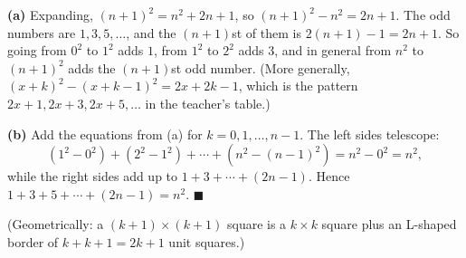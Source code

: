 \textbf{(a)} Expanding, $(n+1)^2=n^2+2n+1$, so $(n+1)^2-n^2=2n+1$. The odd numbers are $1,3,5,\dots$, and the $(n+1)$st of them is $2(n+1)-1=2n+1$. So going from $0^2$ to $1^2$ adds $1$, from $1^2$ to $2^2$ adds $3$, and in general from $n^2$ to $(n+1)^2$ adds the $(n+1)$st odd number. (More generally, $(x+k)^2-(x+k-1)^2=2x+2k-1$, which is the pattern $2x+1,2x+3,2x+5,\dots$ in the teacher's table.)

\textbf{(b)} Add the equations from (a) for $k=0,1,\dots,n-1$. The left sides telescope:
\[\left(1^2-0^2\right)+\left(2^2-1^2\right)+\cdots+\left(n^2-(n-1)^2\right)=n^2-0^2=n^2,\]
while the right sides add up to $1+3+\cdots+(2n-1)$. Hence $1+3+5+\cdots+(2n-1)=n^2$. $\blacksquare$

(Geometrically: a $(k+1)\times(k+1)$ square is a $k\times k$ square plus an L-shaped border of $k+k+1=2k+1$ unit squares.)
